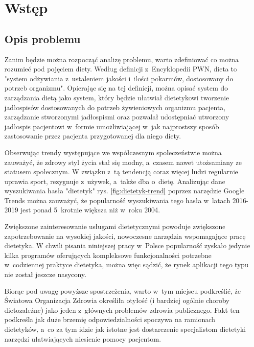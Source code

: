 \chapter*{Wstęp}\label{ch:admission}

\section*{Opis problemu}\label{sec:problem-description}

Zanim będzie można rozpocząć analizę problemu, warto zdefiniować co można rozumieć pod pojęciem diety.
Według definicji z~Encyklopedii PWN, dieta to "system odżywiania z~ustaleniem jakości i~ilości pokarmów, dostosowany do potrzeb organizmu"\cite{book:pwn-dietetyk}. 
Opierając się na tej definicji, można opisać system do zarządzania dietą jako system, który będzie ułatwiał dietetykowi tworzenie jadłospisów dostosowanych do potrzeb żywieniowych organizmu pacjenta, zarządzanie stworzonymi jadłospismi oraz pozwalał udostępniać utworzony jadłospis pacjentowi w~formie umożliwiającej w~jak najprostszy sposób zastosowanie przez pacjenta przygotowanej dla niego diety.

\par
Obserwując trendy występujące we współczesnym społeczeństwie można zauważyć, że zdrowy styl życia stał się modny, a~czasem nawet utożsamiany ze statusem społecznym.
W związku z~tą tendencją coraz więcej ludzi regularnie uprawia sport, rezygnuje z~używek, a~także dba o~dietę.
Analizując dane wyszukiwania hasła "dietetyk" rys. \ref{fig:dietetyk-trend} poprzez narzędzie Google Trends\cite{url:google-trends} można zauważyć, że popularność wyszukiwania tego hasła w~latach 2016-2019 jest ponad 5~krotnie większa niż w~roku 2004.

Zwiększone zainteresowanie usługami dietetycznymi powoduje zwiększone zapotrzebowanie na wysokiej jakości, nowoczesne narzędzia wspomagające pracę dietetyka.
W chwili pisania niniejszej pracy w~Polsce popularność zyskało jedynie kilka programów oferujących kompleksowe funkcjonalności potrzebne w~codziennej praktyce dietetyka, można więc sądzić, że rynek aplikacji tego typu nie został jeszcze nasycony.

\par
Biorąc pod uwagę powyższe spostrzeżenia, warto w~tym miejscu podkreślić, że Światowa Organizacja Zdrowia określiła otyłość (i bardziej ogólnie choroby dietozależne) jako jeden z~głównych problemów zdrowia publicznego\cite{article:dietetyk-na-rynku-uslug-medycznych}.
Fakt ten podkreśla jak duże brzemię odpowiedzialności spoczywa na ramionach dietetyków, a~co za tym idzie jak istotne jest dostarczenie specjalistom dietetyki narzędzi ułatwiających niesienie pomocy pacjentom.

